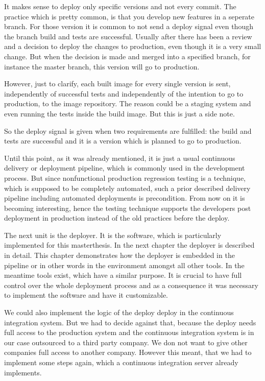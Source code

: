It makes sense to deploy only specific versions and not every commit. The practice which
is pretty common, is that you develop new features in a seperate branch. For those version
it is common to not send a deploy signal even though the branch build and tests are
successful. Usually after there has been a review and a decision to deploy the changes to
production, even though it is a very small change. But when the decision is made and
merged into a specified branch, for instance the master branch, this version will go to
production.

However, just to clarify, each built image for every single version is sent, independently
of successful tests and independently of the intention to go to production, to the image
repository. The reason could be a staging system and even running the tests inside the
build image. But this is just a side note.

So the deploy signal is given when two requirements are fulfilled: the build and tests are
successful and it is a version which is planned to go to production.

Until this point, as it was already mentioned, it is just a usual continuous delivery or
deployment pipeline, which is commonly used in the development process. But since
nonfunctional production regression testing is a technique, which is supposed to be
completely automated, such a prior described delivery pipeline including automated
deployments is precondition. From now on it is becoming interesting, hence the testing
technique supports the developers post deployment in production instead of the old
practices before the deploy.

The next unit is the deployer. It is the software, which is particularly implemented for
this masterthesis. In the next chapter the deployer is described in detail. This chapter
demonstrates how the deployer is embedded in the pipeline or in other words in the
environment amongst all other tools. In the meantime tools exist, which have a similar
purpose. It is crucial to have full control over the whole deployment process and as a
consequence it was necessary to implement the software and have it customizable.

We could also implement the logic of the deploy deploy in the continuous integration
system. But we had to decide against that, because the deploy needs full access to the
production system and the continuous integration system is in our case outsourced to a
third party company. We don not want to give other companies full access to another
company. However this meant, that we had to implement some steps again, which a continuous
integration server already implements.

